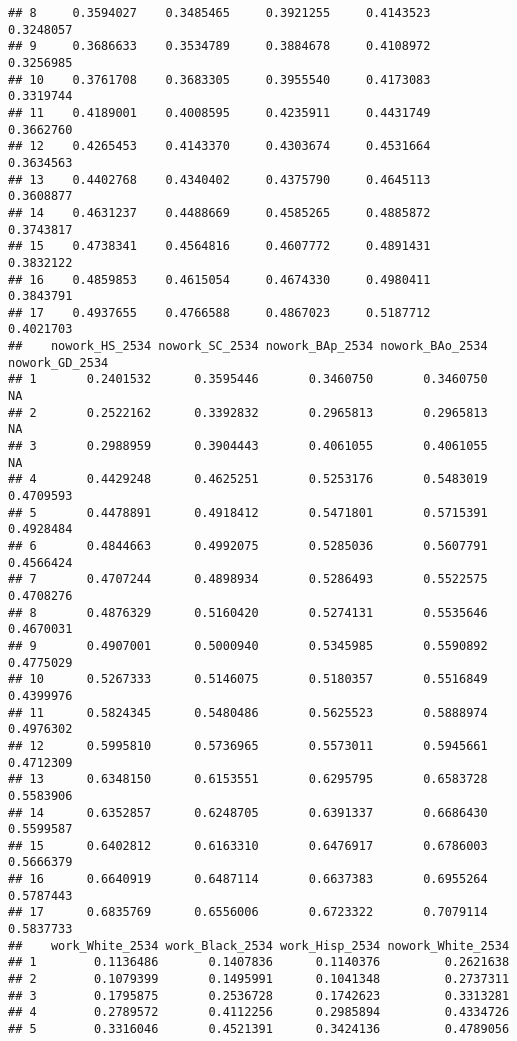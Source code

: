 \documentclass[
]{article}
\begin{document}
\begin{verbatim}
## 8     0.3594027    0.3485465     0.3921255     0.4143523    0.3248057
## 9     0.3686633    0.3534789     0.3884678     0.4108972    0.3256985
## 10    0.3761708    0.3683305     0.3955540     0.4173083    0.3319744
## 11    0.4189001    0.4008595     0.4235911     0.4431749    0.3662760
## 12    0.4265453    0.4143370     0.4303674     0.4531664    0.3634563
## 13    0.4402768    0.4340402     0.4375790     0.4645113    0.3608877
## 14    0.4631237    0.4488669     0.4585265     0.4885872    0.3743817
## 15    0.4738341    0.4564816     0.4607772     0.4891431    0.3832122
## 16    0.4859853    0.4615054     0.4674330     0.4980411    0.3843791
## 17    0.4937655    0.4766588     0.4867023     0.5187712    0.4021703
##    nowork_HS_2534 nowork_SC_2534 nowork_BAp_2534 nowork_BAo_2534 nowork_GD_2534
## 1       0.2401532      0.3595446       0.3460750       0.3460750             NA
## 2       0.2522162      0.3392832       0.2965813       0.2965813             NA
## 3       0.2988959      0.3904443       0.4061055       0.4061055             NA
## 4       0.4429248      0.4625251       0.5253176       0.5483019      0.4709593
## 5       0.4478891      0.4918412       0.5471801       0.5715391      0.4928484
## 6       0.4844663      0.4992075       0.5285036       0.5607791      0.4566424
## 7       0.4707244      0.4898934       0.5286493       0.5522575      0.4708276
## 8       0.4876329      0.5160420       0.5274131       0.5535646      0.4670031
## 9       0.4907001      0.5000940       0.5345985       0.5590892      0.4775029
## 10      0.5267333      0.5146075       0.5180357       0.5516849      0.4399976
## 11      0.5824345      0.5480486       0.5625523       0.5888974      0.4976302
## 12      0.5995810      0.5736965       0.5573011       0.5945661      0.4712309
## 13      0.6348150      0.6153551       0.6295795       0.6583728      0.5583906
## 14      0.6352857      0.6248705       0.6391337       0.6686430      0.5599587
## 15      0.6402812      0.6163310       0.6476917       0.6786003      0.5666379
## 16      0.6640919      0.6487114       0.6637383       0.6955264      0.5787443
## 17      0.6835769      0.6556006       0.6723322       0.7079114      0.5837733
##    work_White_2534 work_Black_2534 work_Hisp_2534 nowork_White_2534
## 1        0.1136486       0.1407836      0.1140376         0.2621638
## 2        0.1079399       0.1495991      0.1041348         0.2737311
## 3        0.1795875       0.2536728      0.1742623         0.3313281
## 4        0.2789572       0.4112256      0.2985894         0.4334726
## 5        0.3316046       0.4521391      0.3424136         0.4789056

\end{verbatim}
\end{document}
